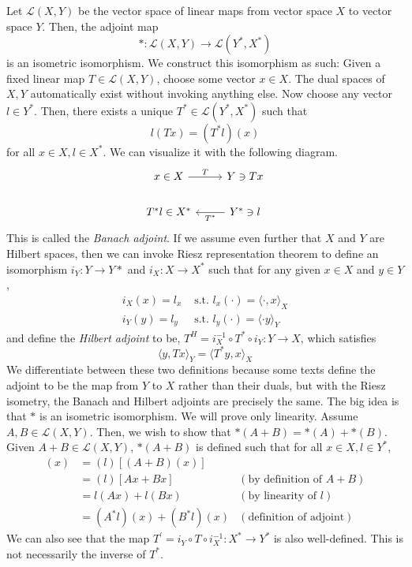 \documentclass{article}
\theoremstyle{remark}
\theoremstyle{definition}
\begin{document}
Let $\mathcal{L}(X, Y)$ be the vector space of linear maps from vector space $X$ to vector space $Y$. Then, the adjoint map 
\[\ast : \mathcal{L}(X, Y) \longrightarrow \mathcal{L}(Y^*, X^*)\]
is an isometric isomorphism. We construct this isomorphism as such: Given a fixed linear map $T \in \mathcal{L}(X, Y)$, choose some vector $x \in X$. The dual spaces of $X, Y$ automatically exist without invoking anything else. Now choose any vector $l \in Y^*$. Then, there exists a unique $T^* \in \mathcal{L}(Y^*, X^*)$ such that 
\[l (Tx) = (T^* l) (x)\]
for all $x \in X, l \in X^*$. We can visualize it with the following diagram. 
\[\begin{tikzcd}
x \in X \arrow{r}{T} & Y \ni Tx \\
T^* l \in X^* & \arrow{l}{T^*} Y^* \ni l
\end{tikzcd}\]
This is called the \textit{Banach adjoint}. If we assume even further that $X$ and $Y$ are Hilbert spaces, then we can invoke Riesz representation theorem to define an isomorphism $i_Y: Y \rightarrow Y*$ and $i_X: X \rightarrow X^*$ such that for any given $x \in X$ and $y \in Y$, 
\begin{align*}
    i_X (x) = l_x & \text{ s.t. } l_x (\cdot) = \langle \cdot, x \rangle_X \\ 
    i_Y (y) = l_y & \text{ s.t. } l_y (\cdot) = \langle \cdot y \rangle_Y 
\end{align*}
and define the \textit{Hilbert adjoint} to be, $T^H = i_X^{-1} \circ T^* \circ i_Y: Y \longrightarrow X$, which satisfies 
\[\langle y, Tx \rangle_Y = \langle T^* y, x \rangle_X\]
We differentiate between these two definitions because some texts define the adjoint to be the map from $Y$ to $X$ rather than their duals, but with the Riesz isometry, the Banach and Hilbert adjoints are precisely the same. The big idea is that $\ast$ is an isometric isomorphism. We will prove only linearity. Assume $A, B \in \mathcal{L}(X, Y)$. Then, we wish to show that $\ast(A + B) = \ast(A) + \ast(B)$. Given $A + B \in \mathcal{L}(X, Y)$, $\ast(A + B)$ is defined such that for all $x \in X, l \in Y^*$, 
\begin{align*}
    [ (A + B)^* (l) ] (x) & = (l) [(A + B)(x)] \\
    & = (l) [A x + Bx] & (\text{by definition of } A + B) \\ 
    & = l(Ax) + l(Bx) & (\text{by linearity of } l) \\
    & = (A^* l)(x) + (B^* l)(x) & (\text{definition of adjoint}) 
\end{align*}
We can also see that the map $T^\prime = i_Y \circ T \circ i_X^{-1} : X^* \longrightarrow Y^*$ is also well-defined. This is not necessarily the inverse of $T^*$. 
\end{document}
